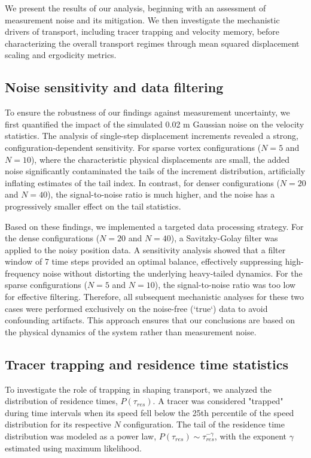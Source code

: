 \documentclass[]{article}
\begin{document}
We present the results of our analysis, beginning with an assessment of measurement noise and its mitigation. We then investigate the mechanistic drivers of transport, including tracer trapping and velocity memory, before characterizing the overall transport regimes through mean squared displacement scaling and ergodicity metrics.

\subsection{Noise sensitivity and data filtering}

To ensure the robustness of our findings against measurement uncertainty, we first quantified the impact of the simulated 0.02 m Gaussian noise on the velocity statistics. The analysis of single-step displacement increments revealed a strong, configuration-dependent sensitivity. For sparse vortex configurations ($N=5$ and $N=10$), where the characteristic physical displacements are small, the added noise significantly contaminated the tails of the increment distribution, artificially inflating estimates of the tail index. In contrast, for denser configurations ($N=20$ and $N=40$), the signal-to-noise ratio is much higher, and the noise has a progressively smaller effect on the tail statistics.

Based on these findings, we implemented a targeted data processing strategy. For the dense configurations ($N=20$ and $N=40$), a Savitzky-Golay filter was applied to the noisy position data. A sensitivity analysis showed that a filter window of 7 time steps provided an optimal balance, effectively suppressing high-frequency noise without distorting the underlying heavy-tailed dynamics. For the sparse configurations ($N=5$ and $N=10$), the signal-to-noise ratio was too low for effective filtering. Therefore, all subsequent mechanistic analyses for these two cases were performed exclusively on the noise-free (`true`) data to avoid confounding artifacts. This approach ensures that our conclusions are based on the physical dynamics of the system rather than measurement noise.

\subsection{Tracer trapping and residence time statistics}

To investigate the role of trapping in shaping transport, we analyzed the distribution of residence times, $P(\tau_{res})$. A tracer was considered "trapped" during time intervals when its speed fell below the 25th percentile of the speed distribution for its respective $N$ configuration. The tail of the residence time distribution was modeled as a power law, $P(\tau_{res}) \sim \tau_{res}^{-\gamma}$, with the exponent $\gamma$ estimated using maximum likelihood.
\end{document}
